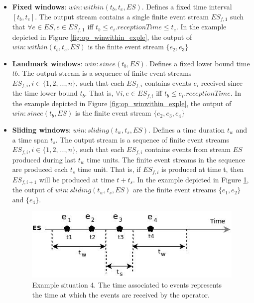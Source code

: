 \begin{itemize} 
\item \textbf{Fixed windows}: $win:within(t_b, t_e, ES)$. Defines a fixed time interval $[t_b, t_e]$. The output stream contains a single finite event stream $ES_{f,1}$ such that $\forall e \in ES, e \in ES_{f,1}$ iff $t_b \leq e_i.receptionTime \leq t_e $. In the example depicted in Figure \ref{fig:op_winwithin_exple}, the output of $win:within(t_b, t_e, ES)$ is the finite event stream $\{e_2, e_3\}$ 
\item \textbf{Landmark windows}: $win:since(t_b, ES)$. Defines a fixed lower bound time $tb$. The output stream is a sequence of finite event streams $ES_{f,i}, i \in \{1, 2, …, n\}$, such that each $ES_{f,i}$ contains events $e_i$ received since the time lower bound $t_b$. That is, $\forall i, e \in ES_{f,i}$ iff $t_b \leq e_i.receptionTime$.
In the example depicted in Figure \ref{fig:op_winwithin_exple}, the output of $win:since(t_b, ES)$ is the finite event stream $\{e_2, e_3, e_4\}$ 
\item \textbf{Sliding windows}: $win:sliding(t_w, t_s, ES)$. Defines a time duration $t_w$ and a time span $t_s$. The output stream
is a sequence of finite event streams  $ES_{f,i}, i \in \{1, 2, …, n\}$, such that each $ES_{f,i}$ contains events from stream $ES$ produced 
during last $t_w$ time units. The finite event streams in the sequence are produced each $t_s$ time unit. That is, if $ES_{f,i}$ is produced at time t, then $ES_{f,i+1}$ will be produced at time $t+t_s$.
In the example depicted in Figure \ref{fig:op_winsliding_exple}, the output of $win:sliding(t_w, t_s, ES)$ are the finite event streams $\{e_1, e_2\}$ and $\{e_4\}$.
\begin{figure}[h]
  \begin{center}
    \includegraphics[scale=0.65]{chap3/images/winslidingExample.jpeg}
  \end{center}
  \caption{Example situation 4. The time associated to events represents the time at which the events are received by the operator.}
  \label{fig:op_winsliding_exple}
\end{figure}
\end{itemize}
